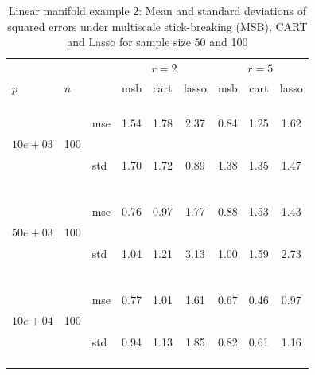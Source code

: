 \documentclass{article} %
\newcommand{\efoo}{\end{footnotesize}}
\newcommand{\bfoo}{\begin{footnotesize}}
\begin{document}
\begin{table}[t]
\caption{Linear manifold example 2: Mean and standard deviations of squared errors under multiscale stick-breaking (MSB), CART and Lasso for sample size 50 and 100}\label{table:linear2}
\vskip 0.15in
\begin{center}
\begin{small}
\begin{sc}
\begin{tabular}{lllcccccc}
\hline
&&&\multicolumn{3}{c}{$r=2$}&\multicolumn{3}{c}{$r=5$}\\
$p$&$n$& & msb&cart&lasso & msb&cart&lasso \\

%
%
\\

\multirow{2}{*}{$10e+03$}&\multirow{2}{*}{100}&\bfoo mse\efoo&1.54 &1.78&2.37&0.84&1.25&1.62\\
&&\bfoo std\efoo &1.70&1.72&0.89&1.38&1.35&1.47\\


\\
\multirow{2}{*}{$50e+03$}&\multirow{2}{*}{100}&\bfoo mse\efoo&0.76&0.97&1.77&0.88&1.53&1.43\\
&&\bfoo std\efoo &1.04&1.21&3.13&1.00&1.59&2.73\\

\\

\multirow{2}{*}{$10e+04$}&\multirow{2}{*}{100}&\bfoo mse\efoo&0.77 &1.01&1.61&0.67&0.46&0.97\\
&&\bfoo std\efoo &0.94&1.13&1.85&0.82&0.61&1.16\\
\\


\end{tabular}
\end{sc}
\end{small}
\end{center}
\end{table}
\end{document}
